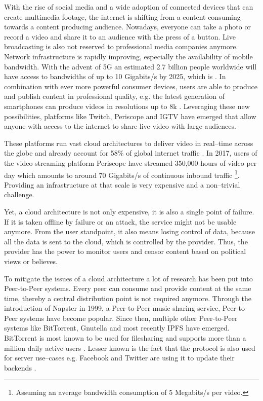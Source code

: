 With the rise of social media and a wide adoption of connected devices that can create multimedia footage, the internet is shifting from a content consuming towards a content producing audience. Nowadays, everyone can take a photo or record a video and share it to an audience with the press of a button. 
Live broadcasting is also not reserved to professional media companies anymore. Network infrastructure is rapidly improving, especially the availability of mobile bandwidth. With the advent of 5G an estimated 2.7 billion people worldwide \cite{5g-stats} will have access to bandwidths of up to 10 Gigabits/s by 2025, which is \cite{5g-promises}. In combination with ever more powerful consumer devices, users are able to produce and publish content in professional quality, e.g. the latest generation of smartphones can produce videos in resolutions up to 8k \cite{samsung-8k}.
Leveraging these new possibilities, platforms like Twitch, Periscope and IGTV have emerged that allow anyone with access to the internet to share live video with large audiences.

These platforms run vast cloud architectures to deliver video in real–time across the globe and already account for 58\% of global internet traffic \cite{phenomena-report}.
In 2017, users of the video streaming platform Periscope have streamed 350,000 hours of video per day \cite{periscope-stats} which amounts to around 70 Gigabits/s of continuous inbound traffic \footnote{Assuming an average bandwidth consumption of 5 Megabits/s per video.}.
Providing an infrastructure at that scale is very expensive and a non–trivial challenge.

Yet, a cloud architecture is not only expensive, it is also a single point of failure. If it is taken offline by failure or an attack, the service might not be usable anymore.
From the user standpoint, it also means losing control of data, because all the data is sent to the cloud, which is controlled by the provider. Thus, the provider has the power to monitor users and censor content based on political views or believes.

To mitigate the issues of a cloud architecture a lot of research has been put into Peer-to-Peer systems. Every peer can consume and provide content at the same time, thereby a central distribution point is not required anymore. Through the introduction of Napster in 1999, a Peer-to-Peer music sharing service, Peer-to-Peer systems have become popular. Since then, multiple other Peer-to-Peer systems like BitTorrent, Gnutella and most recently IPFS have emerged. BitTorrent is most known to be used for filesharing and supports more than a million daily active users \cite{bittorrent-stats}. Lesser known is the fact that the protocol is also used for server use–cases e.g. Facebook and Twitter are using it to update their backends \cite{bittorrent-facebook}.

